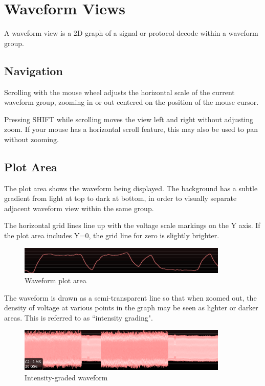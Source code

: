 \chapter{Waveform Views}

A waveform view is a 2D graph of a signal or protocol decode within a waveform group.

\section{Navigation}

Scrolling with the mouse wheel adjusts the horizontal scale of the current waveform group, zooming in or out centered
on the position of the mouse cursor.

Pressing SHIFT while scrolling moves the view left and right without adjusting zoom. If your mouse has a horizontal
scroll feature, this may also be used to pan without zooming.

\section{Plot Area}

The plot area shows the waveform being displayed. The background has a subtle gradient from light at top to dark at
bottom, in order to visually separate adjacent waveform view within the same group.

The horizontal grid lines line up with the voltage scale markings on the Y axis. If the plot area includes Y=0, the
grid line for zero is slightly brighter.

\begin{figure}[H]
\centering
\includegraphics[width=10cm]{images/waveform-graph.png}
\caption{Waveform plot area}
\label{waveform-graph}
\end{figure}

The waveform is drawn as a semi-transparent line so that when zoomed out, the density of voltage at various points in
the graph may be seen as lighter or darker areas. This is referred to as ``intensity grading".

\begin{figure}[H]
\centering
\includegraphics[width=10cm]{images/graded-waveform.png}
\caption{Intensity-graded waveform}
\label{graded-waveform2}
\end{figure}

